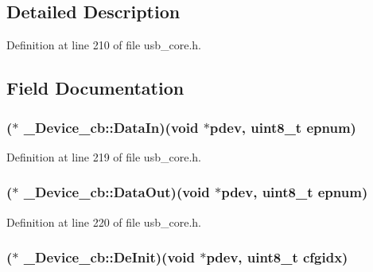 \subsection{Detailed Description}


Definition at line 210 of file usb\-\_\-core.\-h.



\subsection{Field Documentation}
\hypertarget{struct___device__cb_a123969c5d82101054ecfa686ea695db0}{
\subsubsection[{Data\-In}]{($\ast$ \-\_\-\-Device\-\_\-cb\-::\-Data\-In)({\bf void} $\ast$pdev, {\bf uint8\-\_\-t} epnum)}}\label{struct___device__cb_a123969c5d82101054ecfa686ea695db0}


Definition at line 219 of file usb\-\_\-core.\-h.

\hypertarget{struct___device__cb_a420d525bfff88ecb1e819c48251cc6f2}{
\subsubsection[{Data\-Out}]{($\ast$ \-\_\-\-Device\-\_\-cb\-::\-Data\-Out)({\bf void} $\ast$pdev, {\bf uint8\-\_\-t} epnum)}}\label{struct___device__cb_a420d525bfff88ecb1e819c48251cc6f2}


Definition at line 220 of file usb\-\_\-core.\-h.

\hypertarget{struct___device__cb_a356783fc0dd7be07db7d764214937dad}{
\subsubsection[{De\-Init}]{($\ast$ \-\_\-\-Device\-\_\-cb\-::\-De\-Init)({\bf void} $\ast$pdev, {\bf uint8\-\_\-t} cfgidx)}}\label{struct___device__cb_a356783fc0dd7be07db7d764214937dad}


